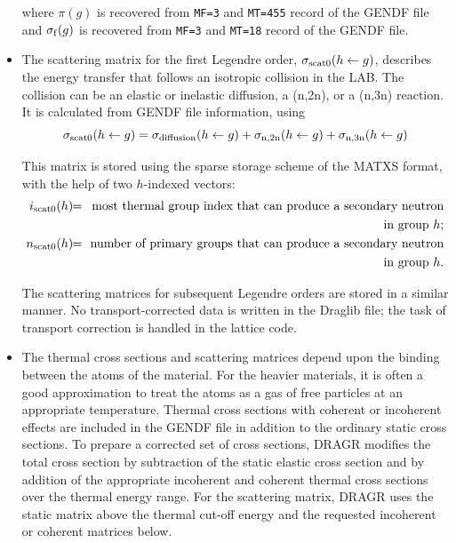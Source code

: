 \begin{itemize}
where $\pi(g)$ is recovered from {\tt MF=3} and {\tt MT=455} record of the
GENDF file and $\sigma_{\rm f}(g)$ is recovered from {\tt MF=3} and {\tt MT=18}
record of the GENDF file.

\item The scattering matrix for the first Legendre order,
$\sigma_{\rm scat0}(h \leftarrow g)$, describes the energy transfer that follows
an isotropic collision in the LAB. The collision can be an elastic or inelastic
diffusion, a (n,2n), or a (n,3n) reaction. It is calculated from GENDF file
information, using
\begin{equation}
\sigma_{\rm scat0}(h \leftarrow g)=\sigma_{\rm diffusion}(h \leftarrow g)+
\sigma_{\rm n,2n}(h \leftarrow g)+\sigma_{\rm n,3n}(h \leftarrow g)
\label{eq:eq1_609}
\end{equation}

This matrix is stored using the sparse storage scheme of the MATXS format,
with the help of two $h$-indexed vectors:
\vskip -0.8cm
\begin{eqnarray*}
i_{\rm scat0}(h) \negthinspace\negthinspace &=& \negthinspace\negthinspace
\hbox{most thermal group index that can produce a secondary neutron} \\
&~&  \negthinspace\negthinspace\hbox{in group $h$;} 
\\
n_{\rm scat0}(h) \negthinspace\negthinspace &=& \negthinspace\negthinspace
\hbox{number of primary groups that can produce a secondary neutron} \\
&~& \negthinspace\negthinspace \hbox{in group $h$.} 
\end{eqnarray*}

The scattering matrices for subsequent Legendre orders are stored in a similar
manner. No transport-corrected data is written in the Draglib file; the task
of transport correction is handled in the lattice code.

\item The thermal cross sections and scattering matrices depend upon the
binding between the atoms of the material. For the heavier materials, it
is often a good approximation to treat the atoms as a gas of free particles
at an appropriate temperature. Thermal cross sections with coherent or
incoherent effects are included in the GENDF file in addition to the ordinary
static cross sections. To prepare a corrected set of cross sections, DRAGR
modifies the total cross section by subtraction of the static elastic cross
section and by addition of the appropriate incoherent and coherent thermal
cross sections over the thermal energy range. For the scattering matrix,
DRAGR uses the static matrix above the thermal cut-off energy and the
requested incoherent or coherent matrices below.


\end{itemize}
